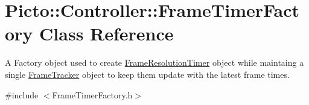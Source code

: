 \hypertarget{class_picto_1_1_controller_1_1_frame_timer_factory}{\section{Picto\-:\-:Controller\-:\-:Frame\-Timer\-Factory Class Reference}
\label{class_picto_1_1_controller_1_1_frame_timer_factory}
}


A Factory object used to create \hyperlink{class_picto_1_1_controller_1_1_frame_resolution_timer}{Frame\-Resolution\-Timer} object while maintaing a single \hyperlink{struct_picto_1_1_controller_1_1_frame_tracker}{Frame\-Tracker} object to keep them update with the latest frame times.  




{\ttfamily \#include $<$Frame\-Timer\-Factory.\-h$>$}

